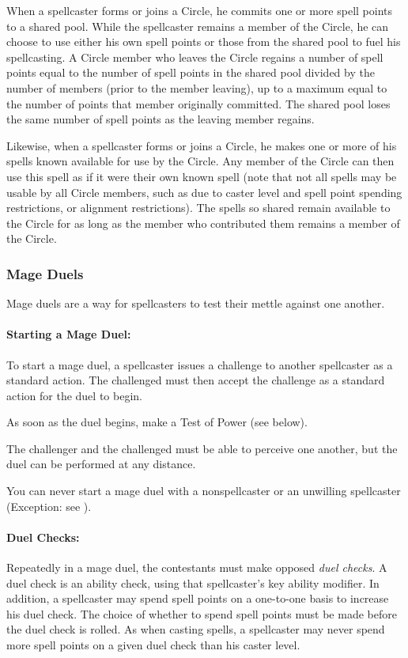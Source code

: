 When a spellcaster forms or joins a Circle, he commits one or more spell points to a shared pool. While the spellcaster remains a member of the Circle, he can choose to use either his own spell points or those from the shared pool to fuel his spellcasting.
A Circle member who leaves the Circle regains a number of spell points equal to the number of spell points in the shared pool divided by the number of members (prior to the member leaving), up to a maximum equal to the number of points that member originally committed. The shared pool loses the same number of spell points as the leaving member regains.

Likewise, when a spellcaster forms or joins a Circle, he makes one or more of his spells known available for use by the Circle. Any member of the Circle can then use this spell as if it were their own known spell (note that not all spells may be usable by all Circle members, such as due to caster level and spell point spending restrictions, or alignment restrictions). The spells so shared remain available to the Circle for as long as the member who contributed them remains a member of the Circle.
\subsubsection{Mage Duels}
\label{sec:MageDuels}
Mage duels are a way for spellcasters to test their mettle against one another.

\paragraph{Starting a Mage Duel:} To start a mage duel, a spellcaster issues a challenge to another spellcaster as a standard action. The challenged must then accept the challenge as a standard action for the duel to begin.

As soon as the duel begins, make a Test of Power (see below).

The challenger and the challenged must be able to perceive one another, but the duel can be performed at any distance.

You can never start a mage duel with a nonspellcaster or an unwilling spellcaster (Exception: see ).
\paragraph{Duel Checks:} Repeatedly in a mage duel, the contestants must make opposed \emph{duel checks}. A duel check is an ability check, using that spellcaster's key ability modifier. In addition, a spellcaster may spend spell points on a one-to-one basis to increase his duel check. The choice of whether to spend spell points must be made before the duel check is rolled. As when casting spells, a spellcaster may never spend more spell points on a given duel check than his caster level.

